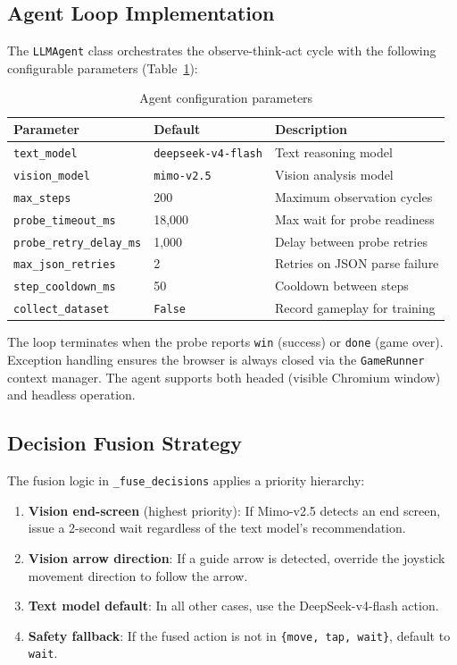 \documentclass[11pt,a4paper]{article}
\begin{document}
\subsection{Agent Loop Implementation}

The \texttt{LLMAgent} class orchestrates the observe-think-act cycle with the following configurable parameters (Table~\ref{tab:agent_config}):

\begin{table}[H]
\centering
\caption{Agent configuration parameters}
\label{tab:agent_config}
\begin{tabular}{@{}lll@{}}
\toprule
\textbf{Parameter} & \textbf{Default} & \textbf{Description} \\
\midrule
\texttt{text\_model} & \texttt{deepseek-v4-flash} & Text reasoning model \\
\texttt{vision\_model} & \texttt{mimo-v2.5} & Vision analysis model \\
\texttt{max\_steps} & 200 & Maximum observation cycles \\
\texttt{probe\_timeout\_ms} & 18,000 & Max wait for probe readiness \\
\texttt{probe\_retry\_delay\_ms} & 1,000 & Delay between probe retries \\
\texttt{max\_json\_retries} & 2 & Retries on JSON parse failure \\
\texttt{step\_cooldown\_ms} & 50 & Cooldown between steps \\
\texttt{collect\_dataset} & \texttt{False} & Record gameplay for training \\
\bottomrule
\end{tabular}
\end{table}

The loop terminates when the probe reports \texttt{win} (success) or \texttt{done} (game over). Exception handling ensures the browser is always closed via the \texttt{GameRunner} context manager. The agent supports both headed (visible Chromium window) and headless operation.

\subsection{Decision Fusion Strategy}

The fusion logic in \texttt{\_fuse\_decisions} applies a priority hierarchy:

\begin{enumerate}[leftmargin=*,itemsep=2pt]
  \item \textbf{Vision end-screen} (highest priority): If Mimo-v2.5 detects an end screen, issue a 2-second wait regardless of the text model's recommendation.
  \item \textbf{Vision arrow direction}: If a guide arrow is detected, override the joystick movement direction to follow the arrow.
  \item \textbf{Text model default}: In all other cases, use the DeepSeek-v4-flash action.
  \item \textbf{Safety fallback}: If the fused action is not in \texttt{\{move, tap, wait\}}, default to \texttt{wait}.
\end{enumerate}
\end{document}
